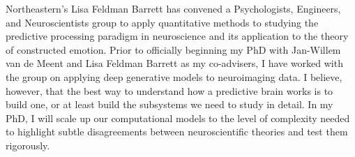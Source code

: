 \begin{singlespace}
\im
Northeastern's Lisa Feldman Barrett has convened a Psychologists,
Engineers, and Neuroscientists group to apply quantitative methods
to studying the predictive processing paradigm in neuroscience and
its application to the theory of constructed emotion\cite{Barrett2015,BarrettTheoryOfConstructed2017}.
Prior to officially beginning my PhD with Jan-Willem van de Meent
and Lisa Feldman Barrett as my co-advisers, I have worked with the
group on applying deep generative models to neuroimaging data. I believe,
however, that the best way to understand how a predictive brain works
is to build one, or at least build the subsystems we need to study
in detail. In my PhD, I will scale up our computational models to
the level of complexity needed to highlight subtle disagreements between
neuroscientific theories and test them rigorously.
\end{singlespace}
